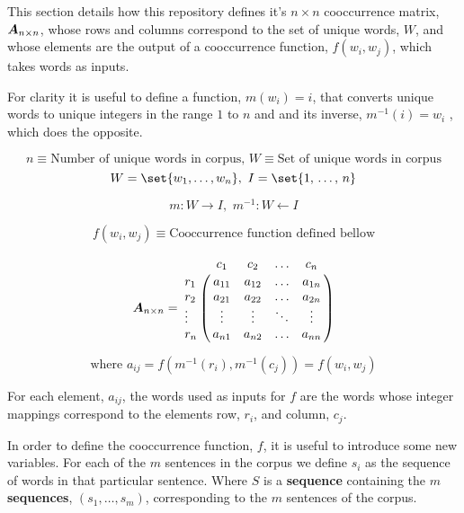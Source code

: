 \documentclass{article}
\begin{document}
This section details how this repository defines it's $n \times n$ cooccurrence matrix, $\boldsymbol{{A}}_{{n} \times {n}}$, whose rows and columns correspond to the set of unique words, $W$, and whose elements are the output of a cooccurrence function, $f(w_i, w_j)$, which takes words as inputs. 

For clarity it is useful to define a function, $m(w_i) = i$, that converts unique words to unique integers in the range $1$ to $n$ and and its inverse, $m^{-1}(i) = w_i$ , which does the opposite.

	\begin{equation*}
	n \equiv \text{Number of unique words in corpus, } W \equiv \text{Set of unique words in corpus}
	\end{equation*}
	\begin{equation*}
	W = \set {w_1,\ldots ,w_n} \text{, } \, I = \set {1,\,\ldots ,\,n}
	\end{equation*}
	
	\begin{equation*}
	m: W \rightarrow I \text{, } \, m^{-1}: W \leftarrow I
	\end{equation*}
	
	\begin{equation*}
	f(w_i,w_j) \equiv \text{Cooccurrence function defined bellow}
	\end{equation*}

\begin{equation*}
\mat{A}{n}{n}=
\bordermatrix{			&	c_1				&	c_2		&	\ldots 	&	c_n			\cr
                r_1		&	a_{11}			&  a_{12} 	& 	\ldots 	& 	a_{1n}		\cr
                r_2		&	a_{21} 			&  a_{22}	& 	\ldots 	& 	a_{2n}		\cr
                \vdots	& 	\vdots 			& 	\vdots 	& 	\ddots 	& 	\vdots		\cr
                r_n		&	a_{n1}			&  a_{n2}   &	\ldots 	& 	a_{nn}}
\end{equation*}

\begin{equation*}
\text{where } a_{ij} = f(m^{-1}(r_i),m^{-1}(c_j)) = f(w_i,w_j)
\end{equation*}

For each element, $a_{ij}$, the words used as inputs for $f$ are the words whose integer mappings correspond to the elements row, $r_i$, and column, $c_j$.


In order to define the cooccurrence function, $f$, it is useful to introduce some new variables. For each of the $m$ sentences in the corpus we define $s_i$ as the sequence of words in that particular sentence. Where $S$ is a \textbf{sequence} containing the $m$ \textbf{sequences}, $\left(s_1, \ldots, s_m \right)$, corresponding to the $m$ sentences of the corpus.
\end{document}
